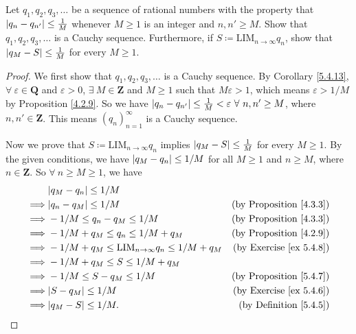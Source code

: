 \begin{exercise}\label{ex 5.5.4}
    Let \(q_1, q_2, q_3, \dots\) be a sequence of rational numbers with the property that \(\abs*{q_n - q_{n'}} \leq \frac{1}{M}\) whenever \(M \geq 1\) is an integer and \(n, n' \geq M\).
    Show that \(q_1, q_2, q_3, \dots\) is a Cauchy sequence.
    Furthermore, if \(S \coloneqq \text{LIM}_{n \to \infty} q_n\), show that \(\abs*{q_M - S} \leq \frac{1}{M}\) for every \(M \geq 1\).
\end{exercise}

\begin{proof}
    We first show that \(q_1, q_2, q_3, \dots\) is a Cauchy sequence.
    By Corollary \ref{5.4.13}, \(\forall\ \varepsilon \in \mathbf{Q}\) and \(\varepsilon > 0\), \(\exists\ M \in \mathbf{Z}\) and \(M \geq 1\) such that \(M\varepsilon > 1\), which means \(\varepsilon > 1 / M\) by Proposition \ref{4.2.9}.
    So we have \(\abs*{q_n - q_{n'}} \leq \frac{1}{M} < \varepsilon \ \forall\ n, n' \geq M\), where \(n, n' \in \mathbf{Z}\).
    This means \((q_n)_{n = 1}^{\infty}\) is a Cauchy sequence.

    Now we prove that \(S \coloneqq \text{LIM}_{n \to \infty} q_n\) implies \(\abs*{q_M - S} \leq \frac{1}{M}\) for every \(M \geq 1\).
    By the given conditions, we have \(\abs*{q_M - q_n} \leq 1 / M\) for all \(M \geq 1\) and \(n \geq M\), where \(n \in \mathbf{Z}\).
    So \(\forall\ n \geq M \geq 1\), we have
    \begin{align*}
                 & \abs*{q_M - q_n} \leq 1 / M                                                                            \\
        \implies & \abs*{q_n - q_M} \leq 1 / M                                      & \text{(by Proposition \ref{4.3.3})} \\
        \implies & -1 / M \leq q_n - q_M \leq 1 / M                                 & \text{(by Proposition \ref{4.3.3})} \\
        \implies & -1 / M + q_M \leq q_n \leq 1 / M + q_M                           & \text{(by Proposition \ref{4.2.9})} \\
        \implies & -1 / M + q_M \leq \text{LIM}_{n \to \infty} q_n \leq 1 / M + q_M & \text{(by Exercise \ref{ex 5.4.8})} \\
        \implies & -1 / M + q_M \leq S \leq 1 / M + q_M                                                                   \\
        \implies & -1 / M \leq S - q_M \leq 1 / M                                   & \text{(by Proposition \ref{5.4.7})} \\
        \implies & \abs*{S - q_M} \leq 1 / M                                        & \text{(by Exercise \ref{ex 5.4.6})} \\
        \implies & \abs*{q_M - S} \leq 1 / M.                                       & \text{(by Definition \ref{5.4.5})}
    \end{align*}
\end{proof}

